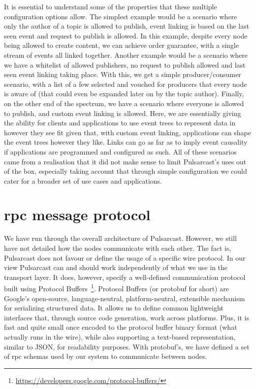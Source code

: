 It is essential to understand some of the properties that these multiple
configuration options allow. The simplest example would be a scenario where
only the author of a topic is allowed to publish, event linking is based on the
last seen event and request to publish is allowed. In this example, despite
every node being allowed to create content, we can achieve order guarantee,
with a single stream of events all linked together. Another example would be a
scenario where we have a whitelist of allowed publishers, no request to publish
allowed and last seen event linking taking place. With this, we get a simple
producer/consumer scenario, with a list of a few selected and vouched for
producers that every node is aware of (that could even be expanded later on by
the topic author). Finally, on the other end of the spectrum, we have a
scenario where everyone is allowed to publish, and custom event linking is
allowed. Here, we are essentially giving the ability for clients and
applications to use event trees to represent data in however they see fit given
that, with custom event linking, applications can shape the event trees however
they like. Links can go as far as to imply event causality if applications are
programmed and configured as such. All of these scenarios came from a
realisation that it did not make sense to limit Pulsarcast's uses out of the
box, especially taking account that through simple configuration we could cater
for a broader set of use cases and applications.

\section{\acrshort{rpc} message protocol}\label{rpc-message}

We have run through the overall architecture of Pulsarcast. However, we still
have not detailed how the nodes communicate with each other. The fact is,
Pulsarcast does not favour or define the usage of a specific wire protocol. In
our view Pulsarcast can and should work independently of what we use in the
transport layer. It does, however, specify a well-defined communication
protocol built using Protocol
Buffers~\footnote{\url{https://developers.google.com/protocol-buffers/}}. Protocol
Buffers (or protobuf for short) are Google's open-source, language-neutral,
platform-neutral, extensible mechanism for serializing structured data. It
allows us to define common lightweight interfaces that, through source code
generation, work across platforms. Plus, it is fast and quite small once
encoded to the protocol buffer binary format (what actually runs in the wire),
while also supporting a text-based representation, similar to JSON, for
readability purposes. With protobuf's, we have defined a set of \acrfull{rpc}
schemas used by our system to communicate between nodes.

